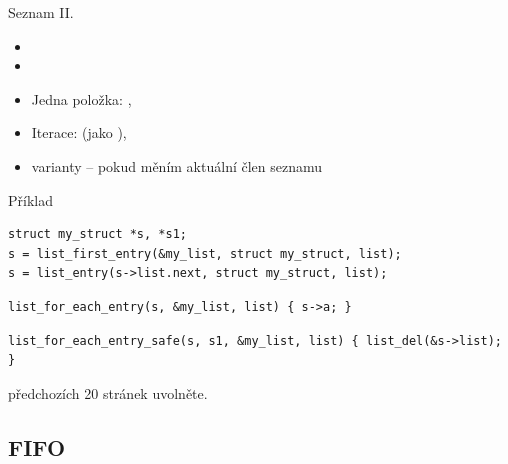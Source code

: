 \begin{frame}[fragile]{Seznam II.}

  \begin{itemize}
    \item {}
    \item {}

    \pause

    \item Jedna položka: , 

    \pause

    \item Iterace:
       (jako ), \\

    \pause

    \item {} varianty -- pokud měním aktuální člen seznamu
  \end{itemize}


  \begin{block}{Příklad}
    \begin{lstlisting}[aboveskip=2pt]
struct my_struct *s, *s1;
s = list_first_entry(&my_list, struct my_struct, list);
s = list_entry(s->list.next, struct my_struct, list);
    \end{lstlisting}
    \begin{lstlisting}[belowskip=0pt]
list_for_each_entry(s, &my_list, list) { s->a; }
    \end{lstlisting}
    \begin{lstlisting}[aboveskip=0pt,belowskip=2pt]
list_for_each_entry_safe(s, s1, &my_list, list) { list_del(&s->list); }
    \end{lstlisting}
  \end{block}

  \pause
  \medskip

   předchozích 20 stránek uvolněte.

\end{frame}

\iffimuni
\subsection{FIFO}
\fi

